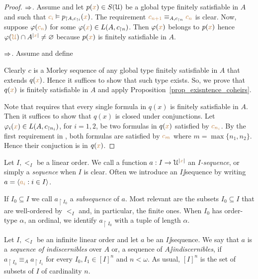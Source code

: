 \documentclass[creche.tex]{subfiles}
\begin{document}
\begin{proof}
$\Rightarrow$. Assume  and let $p({\color{brown} x})\in S(\EuScript U)$ be a global type finitely satisfiable in $A$ and such that ${\color{brown} c_i}\vDash p_{\restriction A,c_{\restriction i}}({\color{brown} x})$. The requirement ${\color{brown} c_{n+1}}\equiv_{A,c_{\restriction n}} {\color{brown} c_n}$ is clear. Now, suppose $\varphi({\color{brown} c_n})$ for some $\varphi({\color{brown} x})\in L(A,c_{\restriction n})$. Then $\varphi({\color{brown} x})$ belongs to $p({\color{brown} x})$ hence $\varphi({\color{brown}\EuScript U})\cap A^{|{\color{brown} x}|}\neq\varnothing$ because $p({\color{brown} x})$ is finitely satisfiable in $A$.

$\Rightarrow$. Assume  and define


Clearly $c$ is a Morley sequence of any global type finitely satisfiable in $A$ that extends $q({\color{brown} x})$. Hence it suffices to show that such type exists. So, we prove that $q({\color{brown} x})$ is finitely satisfiable in $A$ and apply Proposition~\ref{prop_exisntence_coheirs}. 

Note that  requires that every single formula in $q(x)$ is finitely satisfiable in $A$. Then it suffices to show that $q(x)$ is closed under conjunctions. Let $\varphi_i({\color{brown} x})\in L(A,c_{\restriction n_i})$, for $i=1,2$, be two formulas in $q({\color{brown} x})$ satisfied by  ${\color{brown} c_{n_i}}$. By the first requirement in , both formulas are satisfied by ${\color{brown} c_m}$ where $m=\max\{n_1,n_2\}$. Hence their conjuction is in  $q({\color{brown} x})$.
\end{proof}


Let $I,<_I$ be a linear order. We call a function $a:I\to\EuScript U^{|{\color{brown} x}|}$ an \emph{$I$-sequence}, or simply a \emph{sequence\/} when $I$ is clear. Often we introduce an $I\jj$sequence by writing $a=\langle{\color{brown}a_i}: i\in I\rangle$. 

If $I_0\subseteq I$ we call $a_{\restriction I_0}$ a \emph{subsequence\/} of $a$. Most relevant are the subsets $I_0\subseteq I$ that are well-ordered by $<_I$ and, in particular, the finite ones. When $I_0$ has order-type $\alpha$, an ordinal, we identify $a_{\restriction I_0}$ with a tuple of length $\alpha$.  

\begin{definition}
Let $I,<_I$ be an infinite linear order and let $a$ be an $I\jj$sequence. We say that $a$ is a \emph{sequence of indiscernibles\/} over $A$ or, a sequence of \emph{$A\jj$indiscernibles}, if $a_{\restriction I_0}\equiv_A a_{\restriction I_1}$ for every $I_0,I_1\in[I]^n$ and $n<\omega$. As usual, \emph{$[I]^n$\/} is the set of subsets of $I$ of cardinality $n$.\QED
\end{definition}
\end{document}
